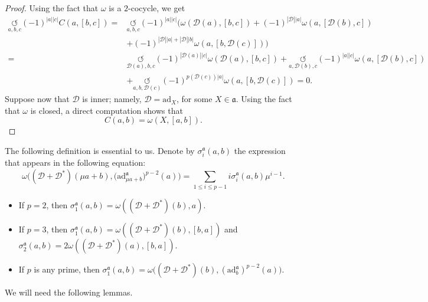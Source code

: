 \documentclass[10pt,a4paper]{amsart}
\numberwithin{equation}{section}
\begin{document}
\begin{proof}
Using the fact that $\omega$ is a $2$-cocycle, we get
\begin{align*}
 \underset{a,b,c}{\circlearrowleft}(-1)^{|a||c|}C(a,[b,c])={}& \underset{a,b,c}{\circlearrowleft}(-1)^{|a||c|}\bigl(\omega({\mathscr D}(a),[b,c])+(-1)^{|{\mathscr D}||a|}\omega(a,[{\mathscr D}(b),c])\\
 &+(-1)^{|{\mathscr D}||a|+|{\mathscr D}||b|}\omega(a,[b,{\mathscr D}(c)])\bigr)\\
={}& \underset{{\mathscr D}(a),b,c}{\circlearrowleft}(-1)^{|{\mathscr D}(a)||c|}\omega({\mathscr D}(a),[b,c])+\underset{a,{\mathscr D}(b),c}{\circlearrowleft}\!(-1)^{|a||c|}\omega(a,[{\mathscr D}(b),c])\\
 &+\underset{a,b,{\mathscr D}(c)}{\circlearrowleft}(-1)^{p({\mathscr D}(c))|a|}\omega(a,[b,{\mathscr D}(c)])=0.
\end{align*}
Suppose now that $\mathscr D$ is inner; namely, $\mathscr D=\mathrm{ad}_X$, for some $X\in \mathfrak{a}$. Using the fact that $\omega$ is closed, a direct computation shows that
\[
C(a,b)=\omega(X, [a,b]). \tag*{\qed}
\]
 \renewcommand{\qed}{}
\end{proof}
The following definition is essential to us. Denote by $\sigma_i^\mathfrak{a}(a,b)$ the expression that appears in the following equation:
\begin{equation}\label{defsigma}
\omega\bigl(({\mathscr D}+{\mathscr D}^*)(\mu a+b),\bigl(\mathrm{ad}^\mathfrak{a}_{\mu a+b}\bigr)^{p-2}(a) \bigr)= \sum_{1\leq i \leq p-1}i \sigma_i^\mathfrak{a}(a,b)\mu^{i-1}.
\end{equation}
\begin{itemize}\itemsep=0pt
\item If $p=2$, then $\sigma_1^\mathfrak{a}(a,b)=\omega(({\mathscr D}+{\mathscr D}^*)(b),a).$
\item If $p=3$, then $\sigma_1^{\mathfrak{a}}(a,b)=\omega(({\mathscr D}+{\mathscr D}^*)(b),[b,a])$ and $\sigma_2^{\mathfrak{a}}(a,b)=2\omega(({\mathscr D}+{\mathscr D}^*)(a),[b,a])$.
\item If $p$ is any prime, then $\sigma_1^{\mathfrak{a}}(a,b)=\omega\bigl(({\mathscr D}+{\mathscr D}^*)(b),(\mathrm{ad}^{\mathfrak{a}}_b)^{p-2}(a)\bigr)$.
\end{itemize}
We will need the following lemmas.
\end{document}

